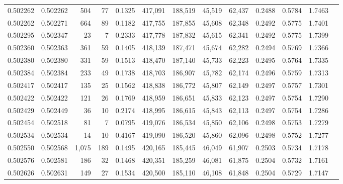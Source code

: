 \begin{tabular}{rrrrrrrrrrrrr}
0.502262 & 0.502262 &   504 &    77 &                                     0.1325 & 417,091 & 188,519 &  45,519 &  62,437 & 0.2488 & 0.5784 & 1.7463 \\
0.502262 & 0.502271 &   664 &    89 &                                     0.1182 & 417,755 & 187,855 &  45,608 &  62,348 & 0.2492 & 0.5775 & 1.7401 \\
0.502295 & 0.502347 &    23 &     7 &                                     0.2333 & 417,778 & 187,832 &  45,615 &  62,341 & 0.2492 & 0.5775 & 1.7399 \\
0.502360 & 0.502363 &   361 &    59 &                                     0.1405 & 418,139 & 187,471 &  45,674 &  62,282 & 0.2494 & 0.5769 & 1.7366 \\
0.502380 & 0.502380 &   331 &    59 &                                     0.1513 & 418,470 & 187,140 &  45,733 &  62,223 & 0.2495 & 0.5764 & 1.7335 \\
0.502384 & 0.502384 &   233 &    49 &                                     0.1738 & 418,703 & 186,907 &  45,782 &  62,174 & 0.2496 & 0.5759 & 1.7313 \\
0.502417 & 0.502417 &   135 &    25 &                                     0.1562 & 418,838 & 186,772 &  45,807 &  62,149 & 0.2497 & 0.5757 & 1.7301 \\
0.502422 & 0.502422 &   121 &    26 &                                     0.1769 & 418,959 & 186,651 &  45,833 &  62,123 & 0.2497 & 0.5754 & 1.7290 \\
0.502429 & 0.502449 &    36 &    10 &                                     0.2174 & 418,995 & 186,615 &  45,843 &  62,113 & 0.2497 & 0.5754 & 1.7286 \\
0.502454 & 0.502518 &    81 &     7 &                                     0.0795 & 419,076 & 186,534 &  45,850 &  62,106 & 0.2498 & 0.5753 & 1.7279 \\
0.502534 & 0.502534 &    14 &    10 &                                     0.4167 & 419,090 & 186,520 &  45,860 &  62,096 & 0.2498 & 0.5752 & 1.7277 \\
0.502550 & 0.502568 & 1,075 &   189 &                                     0.1495 & 420,165 & 185,445 &  46,049 &  61,907 & 0.2503 & 0.5734 & 1.7178 \\
0.502576 & 0.502581 &   186 &    32 &                                     0.1468 & 420,351 & 185,259 &  46,081 &  61,875 & 0.2504 & 0.5732 & 1.7161 \\
0.502626 & 0.502631 &   149 &    27 &                                     0.1534 & 420,500 & 185,110 &  46,108 &  61,848 & 0.2504 & 0.5729 & 1.7147 \\

\end{tabular}
